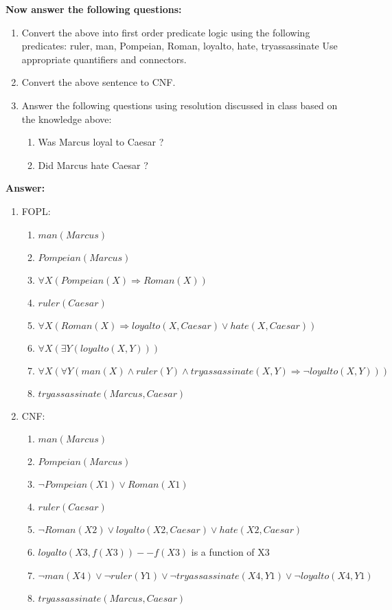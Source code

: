 \documentclass{article}%
\begin{document}
\begin{enumerate}
\textbf{Now answer the following questions:}

	\begin{enumerate}
	\item Convert the above into first order predicate logic using the following predicates: ruler, man, Pompeian, Roman, loyalto, hate, tryassassinate Use appropriate quantifiers and connectors.
	\item Convert the above sentence to CNF.
	\item Answer the following questions using resolution discussed in class based on the knowledge above:
		\begin{enumerate}
		\item Was Marcus loyal to Caesar ?
		\item Did Marcus hate Caesar ?
		\end{enumerate}

	\end{enumerate}
	
	\textbf{Answer:}\\
	\begin{enumerate}
	\item FOPL:
		\begin{enumerate}
		\item $ man(Marcus) $
		\item $ Pompeian(Marcus) $
		\item $ \forall X (Pompeian(X) \Rightarrow Roman(X)) $
		\item $ ruler(Caesar) $
		\item $ \forall X (Roman(X) \Rightarrow loyalto(X, Caesar) \vee hate(X, Caesar)) $
		\item $ \forall X (\exists Y (loyalto(X, Y))) $
		\item $ \forall X (\forall Y ( man(X) \wedge ruler(Y) \wedge tryassassinate(X,Y) \Rightarrow \neg loyalto(X,Y))) $
		\item $ tryassassinate(Marcus, Caesar) $
		\end{enumerate}
	\item CNF: 
		\begin{enumerate}
		\item $ man(Marcus) $
		\item $ Pompeian(Marcus) $
		\item $ \neg Pompeian(X1) \vee Roman(X1) $
		\item $ ruler(Caesar) $
		\item $ \neg Roman(X2) \vee loyalto(X2, Caesar) \vee hate(X2, Caesar) $
		\item $ loyalto(X3, f(X3)) -- f(X3)$ is a function of X3 
		\item $ \neg man(X4) \vee \neg ruler(Y1) \vee \neg tryassassinate(X4,Y1)  \vee \neg loyalto(X4,Y1) $
		\item $ tryassassinate(Marcus, Caesar) $
		\end{enumerate}
		

\end{enumerate}
\end{enumerate}
\end{document}
